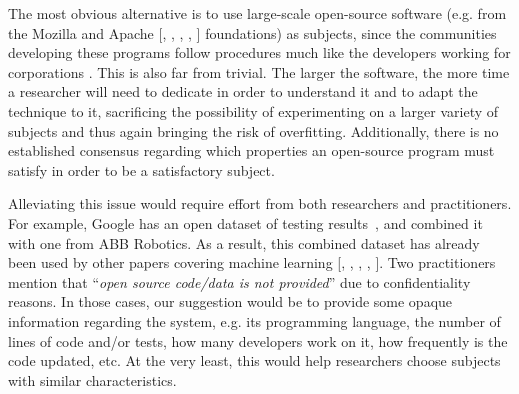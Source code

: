 The most obvious alternative is to use large-scale open-source software (e.g. from the Mozilla  and Apache 
[, 
, 
, 
, 
]
 foundations) as subjects, since the communities developing these programs follow procedures much like the developers working for corporations .
This is also far from trivial.
The larger the software, the more time a researcher will need to dedicate in order to understand it and to adapt the technique to it, sacrificing the possibility of experimenting on a larger variety of subjects and thus again bringing the risk of overfitting.
Additionally, there is no established consensus regarding which properties an open-source program must satisfy in order to be a satisfactory subject.

Alleviating this issue would require effort from both researchers and practitioners.
For example, Google has an open dataset of testing results~\cite{googledataset}, and  combined it with one from ABB Robotics.
As a result, this combined dataset has already been used by other papers covering machine learning 
[, 
, 
, 
, 
].
Two practitioners mention that ``\textit{open source code/data is not provided}'' due to confidentiality reasons.
In those cases, our suggestion would be to provide some opaque information regarding the system, e.g. its programming language, the number of lines of code and/or tests, how many developers work on it, how frequently is the code updated, etc.
At the very least, this would help researchers choose subjects with similar characteristics.


